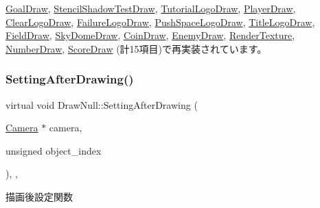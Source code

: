 \mbox{\hyperlink{class_goal_draw_a3eb0a555fa2db9d2c1253018ea65796e}{Goal\+Draw}}, \mbox{\hyperlink{class_stencil_shadow_test_draw_a65be72e71cd12cacf315b0364c12c3e3}{Stencil\+Shadow\+Test\+Draw}}, \mbox{\hyperlink{class_tutorial_logo_draw_a53fc4b1b23c7f9e249600be67510f944}{Tutorial\+Logo\+Draw}}, \mbox{\hyperlink{class_player_draw_ad79a0fbeb618e0913822b573e5d0be68}{Player\+Draw}}, \mbox{\hyperlink{class_clear_logo_draw_a9af656c0a8ebfb5fa133a0983add6ffd}{Clear\+Logo\+Draw}}, \mbox{\hyperlink{class_failure_logo_draw_a718d587edcabb1feea72153a79a65176}{Failure\+Logo\+Draw}}, \mbox{\hyperlink{class_push_space_logo_draw_a7ad3fe53d9bda4ea16c958bc102ff54e}{Push\+Space\+Logo\+Draw}}, \mbox{\hyperlink{class_title_logo_draw_a9f70fb70639510908f4e07ee14667e30}{Title\+Logo\+Draw}}, \mbox{\hyperlink{class_field_draw_a4287d2ce33033b2413c1d3a81b173373}{Field\+Draw}}, \mbox{\hyperlink{class_sky_dome_draw_a5b82e8b650a20dbc0b7ed720d1fb7fab}{Sky\+Dome\+Draw}}, \mbox{\hyperlink{class_coin_draw_ad0f5da5cfb896541fd59b1ab4a8593d1}{Coin\+Draw}}, \mbox{\hyperlink{class_enemy_draw_aa1659c35fa757db6a6cf07e26ad9ddfb}{Enemy\+Draw}}, \mbox{\hyperlink{class_render_texture_a498eb8be8672e01164b3770cdff43291}{Render\+Texture}}, \mbox{\hyperlink{class_number_draw_ad52c1e8b9ae6e830a82c440cc18cb6c9}{Number\+Draw}}, \mbox{\hyperlink{class_score_draw_af013abb96136825e71d4fee06529fc69}{Score\+Draw}} (計15項目)で再実装されています。

\mbox{\label{class_draw_null_a76edfc5af0bf3275f96f40394aff8510}} 
\subsubsection{\texorpdfstring{Setting\+After\+Drawing()}{SettingAfterDrawing()}}
{\footnotesize\ttfamily virtual void Draw\+Null\+::\+Setting\+After\+Drawing (\begin{DoxyParamCaption}\item[{\mbox{\hyperlink{class_camera}{Camera}} $\ast$}]{camera,  }\item[{unsigned}]{object\+\_\+index }\end{DoxyParamCaption})\hspace{0.3cm}{\ttfamily [inline]}, {\ttfamily [override]}, {\ttfamily [virtual]}}



描画後設定関数 


